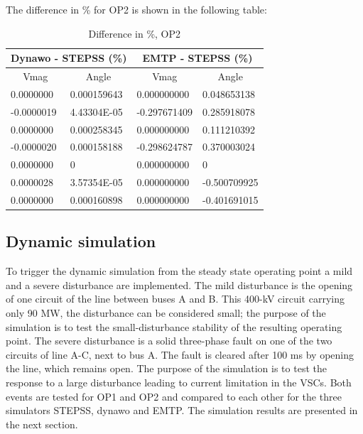 \documentclass{report}
\begin{document}
The difference in \% for OP2 is shown in the following table:
\begin{table}[H]
\centering
\caption{Difference in \%, OP2}
\begin{tabular}{ll|ll}
\multicolumn{2}{c|}{Dynawo - STEPSS (\%)}                    & \multicolumn{2}{c}{EMTP - STEPSS (\%)}                        \\ \hline
\multicolumn{1}{c|}{Vmag}       & \multicolumn{1}{c|}{Angle} & \multicolumn{1}{c|}{Vmag}         & \multicolumn{1}{c}{Angle} \\ \hline
\multicolumn{1}{l|}{0.0000000}  & 0.000159643                & \multicolumn{1}{l|}{0.000000000}  & 0.048653138               \\
\multicolumn{1}{l|}{-0.0000019} & 4.43304E-05                & \multicolumn{1}{l|}{-0.297671409} & 0.285918078               \\
\multicolumn{1}{l|}{0.0000000}  & 0.000258345                & \multicolumn{1}{l|}{0.000000000}  & 0.111210392               \\
\multicolumn{1}{l|}{-0.0000020} & 0.000158188                & \multicolumn{1}{l|}{-0.298624787} & 0.370003024               \\
\multicolumn{1}{l|}{0.0000000}  & 0                          & \multicolumn{1}{l|}{0.000000000}  & 0                         \\
\multicolumn{1}{l|}{0.0000028}  & 3.57354E-05                & \multicolumn{1}{l|}{0.000000000}  & -0.500709925              \\
\multicolumn{1}{l|}{0.0000000}  & 0.000160898                & \multicolumn{1}{l|}{0.000000000}  & -0.401691015             
\end{tabular}
\label{static_diff_OP2}
\end{table}



\subsection{Dynamic simulation}
To trigger the dynamic simulation from the steady state operating point a mild and a severe disturbance are implemented. The mild disturbance is the opening of one circuit of the line between buses A and B. This 400-kV circuit carrying only 90 MW, the disturbance can be considered small; the purpose of the simulation is to test the small-disturbance stability of the resulting operating point.
The severe disturbance is a solid three-phase fault on one of the two circuits of line A-C, next to bus A. The fault is cleared after 100 ms by opening the line, which remains open. The purpose of the simulation is to test the response to a large disturbance leading to current limitation in the VSCs. Both events are tested for OP1 and OP2 and compared to each other for the three simulators STEPSS, dynawo and EMTP. The simulation results are presented in the next section.
\end{document}
